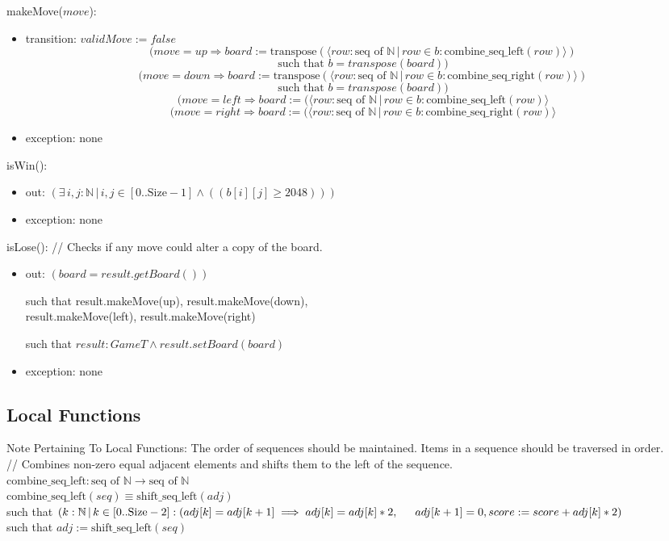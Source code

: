 \documentclass[12pt]{article}
\begin{document}
\noindent makeMove($\mathit{move}$):
\begin{itemize}
\item transition: $validMove := false$\\
$$(move = up \Rightarrow board := \text{transpose}(\langle row:\text{seq of }\mathbb{N}\,|\,row\in b: \text{combine\_seq\_left}(row)\rangle)$$
$$\text{such that }b=transpose(board))$$
$$(move = down \Rightarrow board := \text{transpose}(\langle row:\text{seq of }\mathbb{N}\,|\,row\in b: \text{combine\_seq\_right}(row)\rangle)$$
$$\text{such that }b=transpose(board))$$
$$(move = left \Rightarrow board := (\langle row:\text{seq of }\mathbb{N}\,|\,row\in b: \text{combine\_seq\_left}(row)\rangle$$
$$(move = right \Rightarrow board := (\langle row:\text{seq of }\mathbb{N}\,|\,row\in b: \text{combine\_seq\_right}(row)\rangle$$
\item exception: none
\end{itemize}

\noindent isWin():
\begin{itemize}
\item out: $(\exists\,i,j:\mathbb{N}\,|\,i,j\in[0..\text{Size}-1]\land((b[i][j]\ge 2048)))$
\item exception: none
\end{itemize}

\noindent isLose(): // Checks if any move could alter a copy of the board.
\begin{itemize}
\item out: $(board=result.getBoard())$

such that result.makeMove(up), result.makeMove(down),\\ result.makeMove(left), result.makeMove(right)

such that $result : GameT \wedge result.setBoard(board)$

\item exception: none
\end{itemize}

\subsection*{Local Functions}

\noindent 
Note Pertaining To Local Functions: The order of sequences should be maintained. Items in a sequence should be traversed in order.\\

\noindent // Combines non-zero equal adjacent elements and shifts them to the left of the sequence.\\
\noindent $\mbox{combine\_seq\_left}: \text{seq of } \mathbb{N} \rightarrow \text{seq of } \mathbb{N}$\\
\noindent 
$\mbox{combine\_seq\_left}(seq) \equiv \text{shift\_seq\_left}(adj)$\\
\indent such that $(k:\mathbb{N}\,|\,k \in [0..\text{Size}-2] : (adj[k]=adj[k+1]\implies adj[k]=adj[k]*2,\\ \indent adj[k+1]=0,score:=score+adj[k]*2)$\\
\indent such that $adj := \text{shift\_seq\_left}(seq)$
\end{document}
